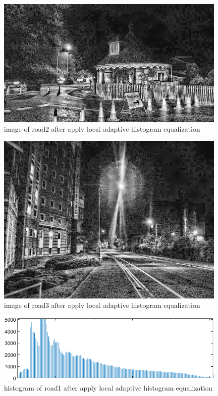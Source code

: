 \documentclass[
	12pt, %
]{fphw}
\begin{document}
\begin{figure}[H]
 
	\centering
	\includegraphics[width=1\columnwidth]{T2/result/I2_local.jpg} 
	\caption{image of road2 after apply local adaptive histogram equalization}
	\label{fig17}
\end{figure}
\begin{figure}[H]
 
	\centering
	\includegraphics[width=1\columnwidth]{T2/result/I3_local.jpg} 
	\caption{image of road3 after apply local adaptive histogram equalization}
	\label{fig18}
\end{figure}
\begin{figure}[H]
 
	\centering
	\includegraphics[width=1\columnwidth]{T2/result/hist1_local.png} 
	\caption{histogram of road1 after apply local adaptive histogram equalization}
	\label{fig19}
\end{figure}
\end{document}
